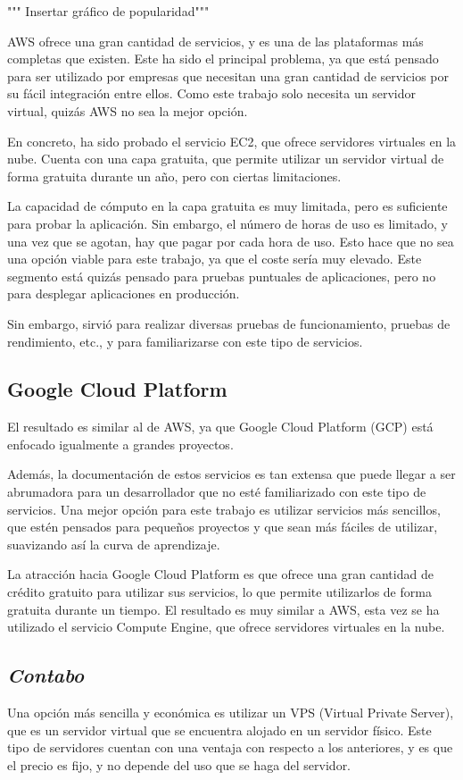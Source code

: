 """ Insertar gráfico de popularidad"""

AWS ofrece una gran cantidad de servicios, y es una de las plataformas más completas que existen.
Este ha sido el principal problema, ya que está pensado para ser utilizado por empresas que necesitan una gran cantidad de servicios por su fácil integración entre ellos.
Como este trabajo solo necesita un servidor virtual, quizás AWS no sea la mejor opción.

En concreto, ha sido probado el servicio EC2, que ofrece servidores virtuales en la nube.
Cuenta con una capa gratuita, que permite utilizar un servidor virtual de forma gratuita durante un año, pero con ciertas limitaciones.

La capacidad de cómputo en la capa gratuita es muy limitada, pero es suficiente para probar la aplicación.
Sin embargo, el número de horas de uso es limitado, y una vez que se agotan, hay que pagar por cada hora de uso.
Esto hace que no sea una opción viable para este trabajo, ya que el coste sería muy elevado.
Este segmento está quizás pensado para pruebas puntuales de aplicaciones, pero no para desplegar aplicaciones en producción.

Sin embargo, sirvió para realizar diversas pruebas de funcionamiento, pruebas de rendimiento, etc., y para familiarizarse con este tipo de servicios.


\subsection{Google Cloud Platform}
El resultado es similar al de AWS, ya que Google Cloud Platform (GCP) está enfocado igualmente a grandes proyectos.

Además, la documentación de estos servicios es tan extensa que puede llegar a ser abrumadora para un desarrollador que no esté familiarizado con este tipo de servicios.
Una mejor opción para este trabajo es utilizar servicios más sencillos, que estén pensados para pequeños proyectos y que sean más fáciles de utilizar, suavizando así la curva de aprendizaje.

La atracción hacia Google Cloud Platform es que ofrece una gran cantidad de crédito gratuito para utilizar sus servicios, lo que permite utilizarlos de forma gratuita durante un tiempo.
El resultado es muy similar a AWS, esta vez se ha utilizado el servicio Compute Engine, que ofrece servidores virtuales en la nube.


\subsection{\textit{Contabo}}
Una opción más sencilla y económica es utilizar un VPS (Virtual Private Server), que es un servidor virtual que se encuentra alojado en un servidor físico.
Este tipo de servidores cuentan con una ventaja con respecto a los anteriores, y es que el precio es fijo, y no depende del uso que se haga del servidor.

